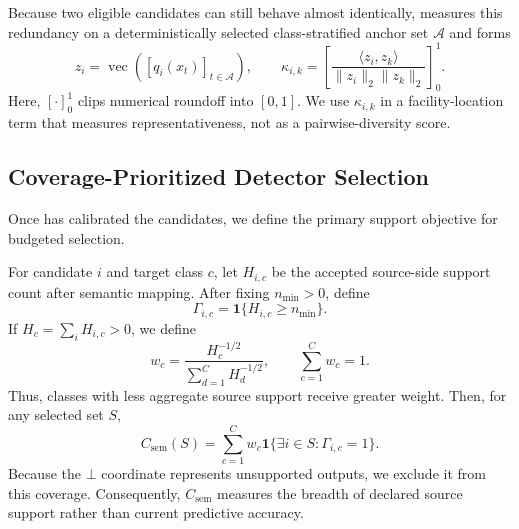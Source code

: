  Because two eligible candidates can still
behave almost identically, \Fname measures this redundancy on a
deterministically selected class-stratified anchor set
$\mathcal A$ and forms
\begin{equation}
z_i=\operatorname{vec}\left([q_i(x_t)]_{t\in\mathcal A}\right),
\qquad
\kappa_{i,k}=\left[
\frac{\langle z_i,z_k\rangle}{\|z_i\|_2\|z_k\|_2}
\right]_{0}^{1}.
\label{eq:behavior_similarity}
\end{equation}
Here, $[\cdot]_0^1$ clips numerical roundoff into $[0,1]$. We use
$\kappa_{i,k}$ in a facility-location term that measures representativeness,
not as a pairwise-diversity score.

\subsection{Coverage-Prioritized Detector Selection}

Once \Fname has calibrated the candidates, we define the primary support
objective for budgeted selection.

 For candidate $i$ and target class $c$,
let $H_{i,c}$ be the accepted
source-side support count after semantic mapping. After fixing
$n_{\min}>0$, define
\begin{equation}
\Gamma_{i,c}=\mathbf 1\{H_{i,c}\ge n_{\min}\}.
\label{eq:semantic_presence}
\end{equation}
If $H_c=\sum_i H_{i,c}>0$, we define
\begin{equation}
w_c=\frac{H_c^{-1/2}}{\sum_{d=1}^{C}H_d^{-1/2}},
\qquad
\sum_{c=1}^{C}w_c=1.
\label{eq:semantic_weights}
\end{equation}
Thus, classes with less aggregate source support receive greater weight.
Then, for any selected set $S$,
\begin{equation}
C_{\mathrm{sem}}(S)=
\sum_{c=1}^{C}w_c
\mathbf 1\{\exists i\in S:\Gamma_{i,c}=1\}.
\label{eq:semantic_coverage}
\end{equation}
Because the $\bot$ coordinate represents unsupported outputs, we exclude it
from this coverage. Consequently, $C_{\mathrm{sem}}$ measures the breadth of
declared source support rather than current predictive accuracy.

